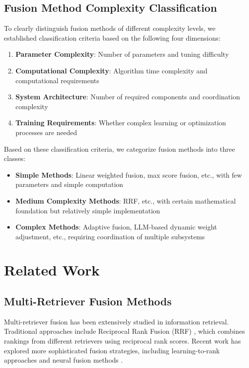 \documentclass[letterpaper]{article} %
\begin{document}
\subsection{Fusion Method Complexity Classification}

To clearly distinguish fusion methods of different complexity levels, we established classification criteria based on the following four dimensions:

\begin{enumerate}
\item \textbf{Parameter Complexity}: Number of parameters and tuning difficulty
\item \textbf{Computational Complexity}: Algorithm time complexity and computational requirements
\item \textbf{System Architecture}: Number of required components and coordination complexity
\item \textbf{Training Requirements}: Whether complex learning or optimization processes are needed
\end{enumerate}

Based on these classification criteria, we categorize fusion methods into three classes:
\begin{itemize}
\item \textbf{Simple Methods}: Linear weighted fusion, max score fusion, etc., with few parameters and simple computation
\item \textbf{Medium Complexity Methods}: RRF, etc., with certain mathematical foundation but relatively simple implementation
\item \textbf{Complex Methods}: Adaptive fusion, LLM-based dynamic weight adjustment, etc., requiring coordination of multiple subsystems
\end{itemize}

\section{Related Work}

\subsection{Multi-Retriever Fusion Methods}

Multi-retriever fusion has been extensively studied in information retrieval. Traditional approaches include Reciprocal Rank Fusion (RRF) \cite{cormack2009reciprocal}, which combines rankings from different retrievers using reciprocal rank scores. Recent work has explored more sophisticated fusion strategies, including learning-to-rank approaches \cite{liu2009learning} and neural fusion methods \cite{zamani2018neural}.
\end{document}
